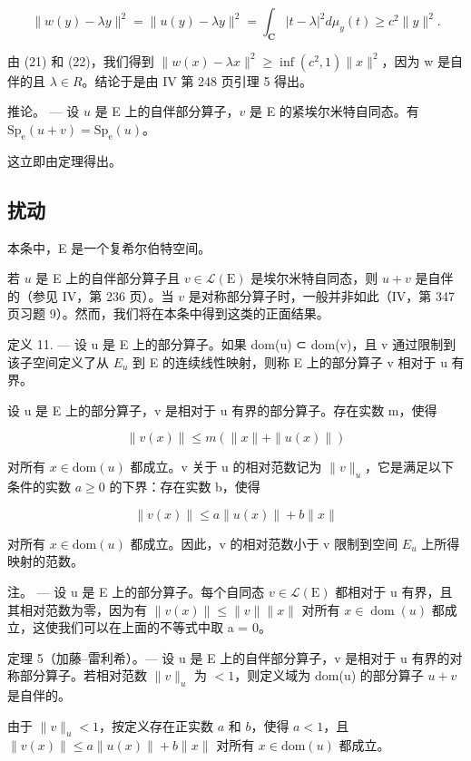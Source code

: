 \[
\| w (y) - \lambda y \| ^ {2} = \| u (y) - \lambda y \| ^ {2} = \int_ {\mathbf {C}} | t - \lambda | ^ {2} d \mu_ {y} (t) \geqslant c ^ {2} \| y \| ^ {2}.\tag{22}
\]

由 (21) 和 (22)，我们得到 \(\|w(x)-\lambda x\|^{2}\geqslant\inf(c^{2},1)\|x\|^{2}\)，因为 w 是自伴的且 \(\lambda\in R\)。结论于是由 IV 第 248 页引理 5 得出。

推论。 --- 设 \(u\) 是 E 上的自伴部分算子，\(v\) 是 E 的紧埃尔米特自同态。有 \(\mathrm{Sp}_{\mathrm{e}}(u + v) = \mathrm{Sp}_{\mathrm{e}}(u)\)。

这立即由定理得出。

\subsection{扰动}

本条中，E 是一个复希尔伯特空间。

若 \(u\) 是 E 上的自伴部分算子且 \(v \in \mathcal{L}(\mathrm{E})\) 是埃尔米特自同态，则 \(u + v\) 是自伴的（参见 IV，第 236 页）。当 \(v\) 是对称部分算子时，一般并非如此（IV，第 347 页习题 9）。然而，我们将在本条中得到这类的正面结果。

定义 11. --- 设 u 是 E 上的部分算子。如果 dom(u) ⊂ dom(v)，且 v 通过限制到该子空间定义了从 \(E_{u}\) 到 E 的连续线性映射，则称 E 上的部分算子 v 相对于 u 有界。

设 u 是 E 上的部分算子，v 是相对于 u 有界的部分算子。存在实数 m，使得

\[
\| v (x) \| \leqslant m (\| x \| + \| u (x) \|)
\]

对所有 \(x \in \text{dom}(u)\) 都成立。v 关于 u 的相对范数记为 \(\|v\|_{u}\)，它是满足以下条件的实数 \(a \geqslant 0\) 的下界：存在实数 b，使得

\[
\| v (x) \| \leqslant a \| u (x) \| + b \| x \|
\]

对所有 \(x \in \text{dom}(u)\) 都成立。因此，v 的相对范数小于 v 限制到空间 \(E_{u}\) 上所得映射的范数。

注。 --- 设 u 是 E 上的部分算子。每个自同态 \(v \in \mathcal{L}(\mathrm{E})\) 都相对于 u 有界，且其相对范数为零，因为有 \(\|v(x)\| \leqslant \|v\|\|x\|\) 对所有 \(x \in \operatorname{dom}(u)\) 都成立，这使我们可以在上面的不等式中取 a = 0。

定理 5（加藤–雷利希）。— 设 u 是 E 上的自伴部分算子，v 是相对于 u 有界的对称部分算子。若相对范数 \(\|v\|_{u}\) 为 \(< 1\)，则定义域为 dom(u) 的部分算子 \(u + v\) 是自伴的。

由于 \(\| v \|_u < 1\)，按定义存在正实数 \(a\) 和 \(b\)，使得 \(a < 1\)，且 \(\| v(x) \| \leqslant a \| u(x) \| + b \| x \|\) 对所有 \(x \in \text{dom}(u)\) 都成立。

